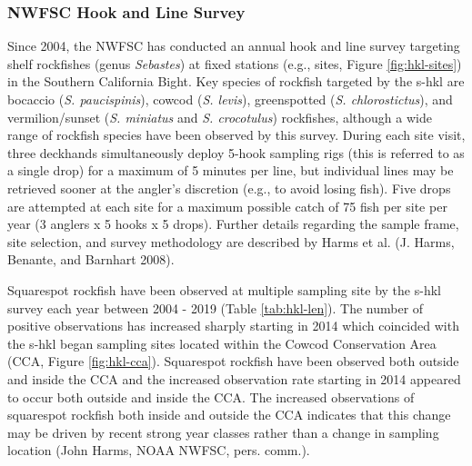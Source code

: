 \documentclass[11pt,
  english,
  a4paper,
]{article}
\begin{document}
\hypertarget{nwfsc-hook-and-line-survey}{%
\subsubsection{NWFSC Hook and Line Survey}\label{nwfsc-hook-and-line-survey}}

\leavevmode\tagmcend\tagstructend


Since 2004, the NWFSC has conducted an annual hook and line survey targeting shelf rockfishes (genus \emph{Sebastes}) at fixed stations (e.g., sites, Figure \ref{fig:hkl-sites}) in the Southern California Bight. Key species of rockfish targeted by the \gls{s-hkl} are bocaccio (\emph{S. paucispinis}), cowcod (\emph{S. levis}), greenspotted (\emph{S. chlorostictus}), and vermilion/sunset (\emph{S. miniatus} and \emph{S. crocotulus}) rockfishes, although a wide range of rockfish species have been observed by this survey. During each site visit, three deckhands simultaneously deploy 5-hook sampling rigs (this is referred to as a single drop) for a maximum of 5 minutes per line, but individual lines may be retrieved sooner at the angler's discretion (e.g., to avoid losing fish). Five drops are attempted at each site for a maximum possible catch of 75 fish per site per year (3 anglers x 5 hooks x 5 drops). Further details regarding the sample frame, site selection, and survey methodology are described by Harms et al. {(J. Harms, Benante, and Barnhart 2008)\leavevmode\tagmcend\tagstructend}.

\leavevmode\tagmcend\tagstructend\par


Squarespot rockfish have been observed at multiple sampling site by the \Gls{s-hkl} survey each year between 2004 - 2019 (Table \ref{tab:hkl-len}). The number of positive observations has increased sharply starting in 2014 which coincided with the \gls{s-hkl} began sampling sites located within the Cowcod Conservation Area (CCA, Figure \ref{fig:hkl-cca}). Squarespot rockfish have been observed both outside and inside the CCA and the increased observation rate starting in 2014 appeared to occur both outside and inside the CCA. The increased observations of squarespot rockfish both inside and outside the CCA indicates that this change may be driven by recent strong year classes rather than a change in sampling location (John Harms, NOAA NWFSC, pers. comm.).
\end{document}
